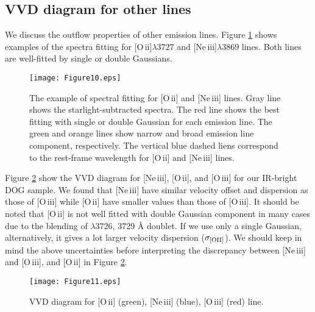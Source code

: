 \documentclass[twocolumn]{aastex6}
\newcommand{\oiii}{[O{\,\sc iii}]\,\,}
\newcommand{\oii}{[O{\,\sc ii}]\,\,}
\newcommand{\neiii}{[Ne{\,\sc iii}]\,\,}
\begin{document}
\subsection{VVD diagram for other lines}
We discuss the outflow properties of other emission lines.
Figure \ref{spec_OII_NeIII} shows examples of the spectra fitting for [O{\,\sc ii}]$\lambda3727$ and [Ne{\,\sc iii}]$\lambda3869$ lines.
Both lines are well-fitted by single or double Gaussians.

   \begin{figure}
   \centering
   \texttt{[image: Figure10.eps]}
   \caption{The example of spectral fitting for \oii and \neiii lines. Gray line shows the starlight-subtracted spectra. The red line shows the best fitting with single or double Gaussian for each emission line. The green and orange lines show narrow and broad emission line component, respectively. The vertical blue dashed liens correspond to the rest-frame wavelength for [O{\,\sc ii}] and [Ne{\,\sc iii}] lines.}
   \label{spec_OII_NeIII}
   \end{figure} 
Figure \ref{VVD_OII_NeIII} show the VVD diagram for [Ne{\,\sc iii}], [O{\,\sc ii}], and \oiii for our IR-bright DOG sample.
We found that \neiii have similar velocity offset and dispersion as those of \oiii while \oii have smaller values than those of [O{\,\sc iii}]. 
It should be noted that \oii is not well fitted with double Gaussian component in many cases due to the blending of $\lambda$3726, 3729 \AA \,\,doublet.
If we use only a single Gaussian, alternatively, it gives a lot larger velocity dispersion  ($\sigma_{\rm [OII]}$).
We should keep in mind the above uncertainties before interpreting the discrepancy between \neiii and [O{\,\sc iii}], and \oii in Figure \ref{VVD_OII_NeIII}.

   \begin{figure}
   \centering
   \texttt{[image: Figure11.eps]}
   \caption{VVD diagram for \oii (green), \neiii (blue), \oiii (red) line.}
   \label{VVD_OII_NeIII}
   \end{figure}
   
\end{document}
